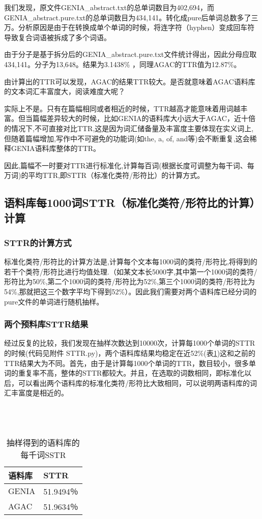 \documentclass{article}
\begin{document}
我们发现，原文件GENIA\_abstract.txt的总单词数目为402,694，而GENIA\_abstract.pure.txt的总单词数目为434,141。转化成pure后单词总数多了三万。分析原因是由于在转换成单个单词的时候，将连字符（hyphen）变成回车符导致复合词语被拆成了多个词语。

由于分子是基于拆分后的GENIA\_abstract.pure.txt文件统计得出，因此分母应取434,141。分子为13,648。结果为3.1438\% ，同理AGAC的TTR值为12.87\%。

由计算出的TTR可以发现，AGAC的结果TTR较大。是否就意味着AGAC语料库的文本词汇丰富度大，阅读难度大呢？

实际上不是。只有在篇幅相同或者相近的时候，TTR越高才能意味着用词越丰富。但当篇幅差异较大的时候，比如GENIA的语料库大小远大于AGAC，近十倍的情况下,不可直接对比TTR,这是因为词汇储备量及丰富度主要体现在实义词上,但随着篇幅增加,写作中不可避免的功能词(如the, a, of, and等)会不断重复,这会稀释GENIA语料库整体的TTR。

因此,篇幅不一时要对TTR进行标准化,计算每百词(根据长度可调整为每干词、每万词)的平均TTR,即STTR（标准化类符/形符比）的计算方式。

	\subsection{语料库每1000词STTR（标准化类符/形符比的计算）计算}
\subsubsection{STTR的计算方式}

标准化类符/形符比的计算方法是,计算每个文本每1000词的类符/形符比,将得到的若干个类符/形符比进行均值处理.（如某文本长5000字,其中第一个1000词的类符/形符比为50\%,第二个1000词的类符/形符比为52\%,第三个1000词的类符/形符比为54\%,那就把这三个数字平均下得到52\%）。因此我们需要对两个语料库已经分词的pure文件的单词进行随机抽样。
\subsubsection{两个预料库STTR结果}
经过反复的比较，我们发现在抽样次数达到10000次，计算每1000个单词的STTR的时候(代码见附件 STTR.py)，两个语料库结果均稳定在近52\%(表\ref{tab})这和之前的TTR结果大为不同。首先，由于是计算每1000个单词的TTR，数目较小，很多单词的重复率不高，整体的STTR都较大。并且，在选取的词数相同，即标准化以后，可以看出两个语料库的标准化类符/形符比大致相同，可以说明两语料库的词汇丰富度是相近的。\\
\\
\\
\\
\begin{table}[h]
\centering
\begin{tabular}{|l|l|}
\hline
语料库   & STTR     \\ \hline
GENIA & 51.9494％ \\ \hline
AGAC  & 51.9634％ \\ \hline
\end{tabular}
\caption{抽样得到的语料库的每千词SSTR}
\label{tab}
\end{table}
\\
\end{document}
